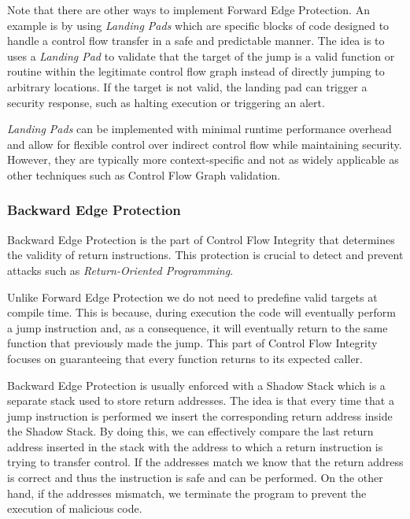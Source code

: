 Note that there are other ways to implement Forward Edge Protection. An example
is by using \textit{Landing Pads} which are specific blocks of code designed to handle
a control flow transfer in a safe and predictable manner. The idea is to uses a
\textit{Landing Pad} to validate that the target of the jump is a valid function
or routine within the legitimate control flow graph instead of directly jumping to
arbitrary locations. If the target is not valid, the landing pad can trigger a security
response, such as halting execution or triggering an alert.

\textit{Landing Pads} can be implemented with minimal runtime performance overhead
and allow for flexible control over indirect control flow while maintaining security.
However, they are typically more context-specific and not as widely applicable as
other techniques such as Control Flow Graph validation.

\subsubsection{Backward Edge Protection}
\label{subsubsec:background_backward}

Backward Edge Protection is the part of Control Flow Integrity that determines
the validity of return instructions. This protection is crucial to detect and prevent
attacks such as \textit{Return-Oriented Programming}.

Unlike Forward Edge Protection we do not need to predefine valid targets at
compile time. This is because, during execution the code will eventually perform
a jump instruction and, as a consequence, it will eventually return to the same
function that previously made the jump. This part of Control Flow Integrity focuses
on guaranteeing that every function returns to its expected caller.

Backward Edge Protection is usually enforced with a Shadow Stack which is a separate
stack used to store return addresses. The idea is that every time that a jump
instruction is performed we insert the corresponding return address inside the
Shadow Stack. By doing this, we can effectively compare the last return address
inserted in the stack with the address to which a return instruction is trying
to transfer control. If the addresses match we know that the return address is correct
and thus the instruction is safe and can be performed. On the other hand, if the
addresses mismatch, we terminate the program to prevent the execution of
malicious code.

